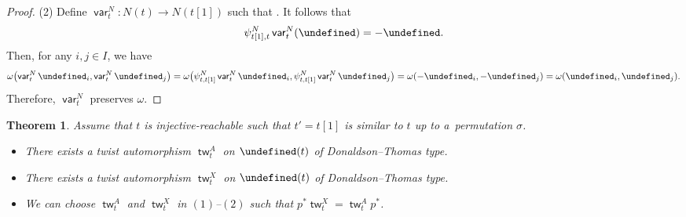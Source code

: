 \documentclass[10pt,a4paper]{amsart}
\renewcommand{\tilde}[1]{\widetilde{#1}}
\newcommand{\opname}[1]{\operatorname{\mathsf{#1}}}
\newcommand{\tw}{{\tilde{w}}}
\newcommand{\var}{\opname{var}}
\newcommand{\fv}{\opname{f}}
\newcommand{\ufv}{\opname{uf}}
\let\upClAlg\undefined
\let\XClAlg\undefined
\let\Id\undefined
\let\ee\undefined
\let\uee\undefined
\let\high\undefined
\renewcommand{\tw}{\opname{tw}}
\newcommand{\upClAlg}{\mathcal{U}^A}
\newcommand{\XClAlg}{\mathcal{U}^X}
\newcommand{\Id}{{\opname{Id}}}
\renewcommand{\tw}{\opname{tw}}
\newcommand{\ee}{\mathbf{e}}
\newcommand{\uee}{\underline{\ee}}
\newcommand{\high}{\opname{\ufv,\fv}}
\numberwithin{equation}{section}
\newtheorem{Theorem}{Theorem}[section]
\begin{document}
\begin{proof}
(2) Define $\var_{t}^{N}\colon N(t)\rightarrow N(t[1])$ such that \smash{$\var_{t}^{N}(\uee)=\uee'\left(\begin{smallmatrix}
\Id_{\ufv} & -E_{\high}\\
0 & -\Id_{\fv}
\end{smallmatrix}\right)$}. It follows that \[\psi_{t[1],t}^{N}\var_{t}^{N}(\uee)=-\uee.\] Then,
for any $i,j\in I$, we have
\begin{gather*}
\omega\bigl(\var_{t}^{N}\ee_{i},\var_{t}^{N}\ee_{j}\bigr) =\omega\big(\psi_{t,t[1]}^{N}\var_{t}^{N}\ee_{i},\psi_{t,t[1]}^{N}\var_{t}^{N}\ee_{j}\big) =\omega(-\ee_{i},-\ee_{j})=\omega(\ee_{i},\ee_{j}).
\end{gather*}
Therefore, $\var_{t}^{N}$ preserves $\omega$.
\end{proof}

\begin{Theorem}\label{thm:twist_DT}
Assume that $t$ is injective-reachable such that $t'=t[1]$ is similar
to $t$ up to a~permutation $\sigma$.
\begin{itemize}\itemsep=0pt
\item[$(1)$] There exists a twist automorphism $\tw_{t}^{A}$ on $\upClAlg(t)$
of Donaldson--Thomas type.
\item[$(2)$] There exists a twist automorphism $\tw_{t}^{X}$ on $\XClAlg(t)$
of Donaldson--Thomas type.
\item[$(3)$] We can choose $\tw_{t}^{A}$ and $\tw_{t}^{X}$ in $(1)$--$(2)$ such that $p^{*}\tw_{t}^{X}=\tw_{t}^{A}p^{*}$.
\end{itemize}
\end{Theorem}
\end{document}
